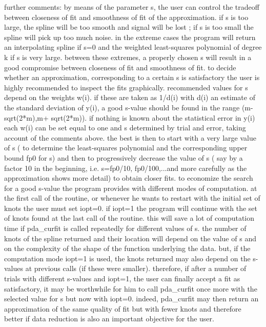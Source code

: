 \documentclass[11pt,twoside,nolof]{starlink}
\begin{document}
\begin{terminalv}
  further comments:
   by means of the parameter s, the user can control the tradeoff
   between closeness of fit and smoothness of fit of the approximation.
   if s is too large, the spline will be too smooth and signal will be
   lost ; if s is too small the spline will pick up too much noise. in
   the extreme cases the program will return an interpolating spline if
   s=0 and the weighted least-squares polynomial of degree k if s is
   very large. between these extremes, a properly chosen s will result
   in a good compromise between closeness of fit and smoothness of fit.
   to decide whether an approximation, corresponding to a certain s is
   satisfactory the user is highly recommended to inspect the fits
   graphically.
   recommended values for s depend on the weights w(i). if these are
   taken as 1/d(i) with d(i) an estimate of the standard deviation of
   y(i), a good s-value should be found in the range (m-sqrt(2*m),m+
   sqrt(2*m)). if nothing is known about the statistical error in y(i)
   each w(i) can be set equal to one and s determined by trial and
   error, taking account of the comments above. the best is then to
   start with a very large value of s ( to determine the least-squares
   polynomial and the corresponding upper bound fp0 for s) and then to
   progressively decrease the value of s ( say by a factor 10 in the
   beginning, i.e. s=fp0/10, fp0/100,...and more carefully as the
   approximation shows more detail) to obtain closer fits.
   to economize the search for a good s-value the program provides with
   different modes of computation. at the first call of the routine, or
   whenever he wants to restart with the initial set of knots the user
   must set iopt=0.
   if iopt=1 the program will continue with the set of knots found at
   the last call of the routine. this will save a lot of computation
   time if pda_curfit is called repeatedly for different values of s.
   the number of knots of the spline returned and their location will
   depend on the value of s and on the complexity of the shape of the
   function underlying the data. but, if the computation mode iopt=1
   is used, the knots returned may also depend on the s-values at
   previous calls (if these were smaller). therefore, if after a number
   of trials with different s-values and iopt=1, the user can finally
   accept a fit as satisfactory, it may be worthwhile for him to call
   pda_curfit once more with the selected value for s but now with iopt=0.
   indeed, pda_curfit may then return an approximation of the same quality
   of fit but with fewer knots and therefore better if data reduction
   is also an important objective for the user.


\end{terminalv}
\end{document}

